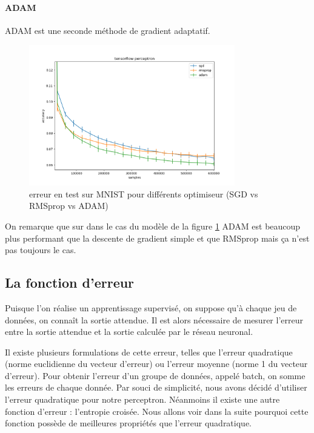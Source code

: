 \paragraph{ADAM}
ADAM est une seconde méthode de gradient adaptatif.

\newpage

\begin{figure}[ht]
 \centering
 \includegraphics[width=0.8\textwidth]{img/sgd_rmsprop_adam.png}
 \caption{erreur en test sur MNIST pour différents optimiseur (SGD vs RMSprop vs ADAM)}
 \label{fig:sgd_rmsprop_adam}
\end{figure}

On remarque que sur dans le cas du modèle de la figure \ref{fig:sgd_rmsprop_adam} ADAM est beaucoup plus performant que la descente de gradient simple et que RMSprop
mais ça n'est pas toujours le cas.


\subsection{La fonction d'erreur}

Puisque l'on réalise un apprentissage supervisé, on suppose qu'à chaque jeu de données, on connaît la sortie attendue. Il est alors nécessaire de mesurer l'erreur entre la sortie attendue et la sortie calculée par le réseau neuronal.

Il existe plusieurs formulations de cette erreur, telles que l'erreur quadratique (norme euclidienne du vecteur d'erreur) ou l'erreur moyenne (norme 1 du vecteur d'erreur).
Pour obtenir l'erreur d'un groupe de données, appelé batch, on somme les erreurs de chaque donnée. Par souci de simplicité, nous avons décidé d'utiliser l'erreur quadratique pour notre perceptron. Néanmoins il existe une autre fonction d'erreur : l'entropie croisée. Nous allons voir dans la suite pourquoi cette fonction possède de meilleures propriétés que l'erreur quadratique.

